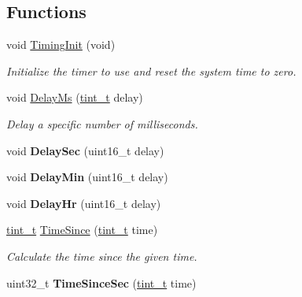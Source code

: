 \subsection*{Functions}
\begin{DoxyCompactItemize}
\item 
\hypertarget{group__timing_ga708280b92693de1cda94095470fbaad8}{void \hyperlink{group__timing_ga708280b92693de1cda94095470fbaad8}{Timing\+Init} (void)}\label{group__timing_ga708280b92693de1cda94095470fbaad8}

\begin{DoxyCompactList}\small\item\em Initialize the timer to use and reset the system time to zero. \end{DoxyCompactList}\item 
void \hyperlink{group__timing_ga5a4bf9e6351a738abf338ceabdf4a095}{Delay\+Ms} (\hyperlink{group__timing_gaef97c9386393beb1be4ed0b1513ee481}{tint\+\_\+t} delay)
\begin{DoxyCompactList}\small\item\em Delay a specific number of milliseconds. \end{DoxyCompactList}\item 
\hypertarget{group__timing_gad640aaef011a34ca9517509417a338ce}{void {\bfseries Delay\+Sec} (uint16\+\_\+t delay)}\label{group__timing_gad640aaef011a34ca9517509417a338ce}

\item 
\hypertarget{group__timing_ga26fe4b60a7c29dabdb7875c72dad884e}{void {\bfseries Delay\+Min} (uint16\+\_\+t delay)}\label{group__timing_ga26fe4b60a7c29dabdb7875c72dad884e}

\item 
\hypertarget{group__timing_ga388d909757f8c758432348356dddc14a}{void {\bfseries Delay\+Hr} (uint16\+\_\+t delay)}\label{group__timing_ga388d909757f8c758432348356dddc14a}

\item 
\hyperlink{group__timing_gaef97c9386393beb1be4ed0b1513ee481}{tint\+\_\+t} \hyperlink{group__timing_ga32e3bcf2162e557d8db29577c4bd8d40}{Time\+Since} (\hyperlink{group__timing_gaef97c9386393beb1be4ed0b1513ee481}{tint\+\_\+t} time)
\begin{DoxyCompactList}\small\item\em Calculate the time since the given time. \end{DoxyCompactList}\item 
\hypertarget{group__timing_gab437f5fda0049cdb6d747253a894ab2a}{uint32\+\_\+t {\bfseries Time\+Since\+Sec} (\hyperlink{group__timing_gaef97c9386393beb1be4ed0b1513ee481}{tint\+\_\+t} time)}\label{group__timing_gab437f5fda0049cdb6d747253a894ab2a}


\end{DoxyCompactItemize}
